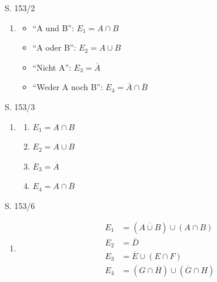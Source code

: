 \begin{Exercise}{S. 153/2}{}
\begin{enumerate}[leftmargin=*]
    \item [2.]\begin{itemize}[leftmargin=*]
        \item {``A und B'': \qquad $E_{1} = A \cap B$}
        \item {``A oder B'': \qquad $E_{2} = A \cup B$}
        \item {``Nicht A'': \qquad $E_{3} = \overline{A}$}
        \item {``Weder A noch B'': \qquad $E_{4} = \overline{A} \cap \overline{B}$}
    \end{itemize}
\end{enumerate}
\end{Exercise}

\begin{Exercise}{S. 153/3}{}
\begin{enumerate}[leftmargin=*]
    \item [3.]\begin{enumerate}[label=\alph*),leftmargin=*]
        \item[a)] {
            $E_{1} = A \cap B$
            }
        \item[b)] {
            $E_{2} = A \cup B$
            }
        \item[c)] {
            $E_{3} = \overline{A}$
            }
        \item[d)] {
            $E_{4} = A \cap \overline{B}$
            }
    \end{enumerate}
\end{enumerate}
\end{Exercise}

\begin{Exercise}{S. 153/6}{}
\begin{enumerate}[leftmargin=*]
    \item [6.]{
        \vspace{-2.0ex}
        \begin{align*}
            E_{1} &= (\overline{A \cup B}) \cup (A \cap B)\\
            E_{2} &= \overline{D}\\
            E_{3} &= \overline{E} \cup (E \cap F)\\
            E_{4} &= (G \cap \overline{H}) \cup (\overline{G} \cap H)
        \end{align*}
    }
\end{enumerate}
\end{Exercise}

